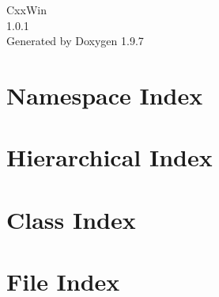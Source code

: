 \documentclass[twoside]{book}
\newcommand{\+}{\discretionary{\mbox{\scriptsize$\hookleftarrow$}}{}{}}
\newcommand{\clearemptydoublepage}{%
    \newpage{\pagestyle{empty}\cleardoublepage}%
  }
\begin{document}
  \raggedbottom
    \hypersetup{pageanchor=false,
                bookmarksnumbered=true,
                pdfencoding=unicode
               }
  \begin{titlepage}
  \vspace*{7cm}
  \begin{center}%
  {\Large Cxx\+Win}\\
  [1ex]\large 1.\+0.\+1 \\
  \vspace*{1cm}
  {\large Generated by Doxygen 1.9.7}\\
  \end{center}
  \end{titlepage}
  \clearemptydoublepage
  \tableofcontents
  \clearemptydoublepage
  \hypersetup{pageanchor=true}

\chapter{Namespace Index}

\chapter{Hierarchical Index}

\chapter{Class Index}

\chapter{File Index}

\end{document}
